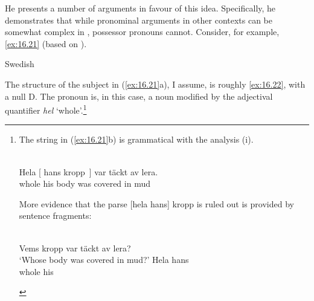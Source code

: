 \documentclass[output=paper]{langsci/langscibook}
\begin{document}
\ea\label{ex:16.20}
    \begin{multicols}{2}\raggedcolumns\ea
    \columnbreak
    \ex
    \z\end{multicols}
\z

He presents a number of arguments in favour of this idea.  Specifically, he
demonstrates that while pronominal arguments in other contexts can be somewhat
complex in , possessor pronouns cannot. Consider, for example, \eqref{ex:16.21}
(based on \citealt{Delsing1998}).\largerpage[-3]

\ea Swedish\label{ex:16.21}
	\z
\z\largerpage[-3]

The structure of the subject in (\ref{ex:16.21}a), I assume, is roughly \eqref{ex:16.22}, with a null
D.  The pronoun is, in this case, a noun modified by the adjectival quantifier
\emph{hel} `whole'.\footnote{The string in (\ref{ex:16.21}b) is grammatical with the
    analysis (i).

\begin{exe}
    \\
	\gll Hela   [ hans kropp~] var täckt av lera.\\
        whole {} his  body was covered in mud\\
	\glt
\end{exe}

More evidence that the parse [hela hans] kropp is ruled out is provided by
sentence fragments:

\begin{exe}
    \\
    Vems kropp var täckt av lera?\\
        `Whose body was covered in mud?'
    \llap{*}
		\gll Hela hans\\
            whole his\\
\end{exe}}
\end{document}
